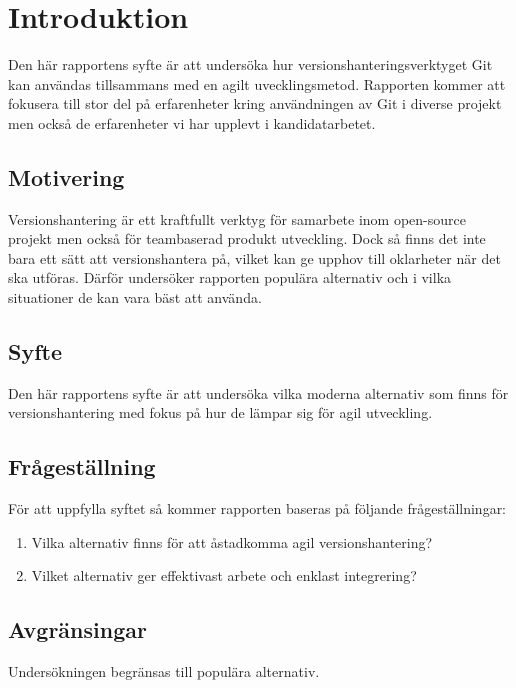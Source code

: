 \section{Introduktion}
\label{sec:bjorn-introduction}

Den här rapportens syfte är att undersöka hur versionshanteringsverktyget Git kan användas tillsammans med en agilt uvecklingsmetod. Rapporten kommer att fokusera till stor del på erfarenheter kring användningen av Git i diverse projekt men också de erfarenheter vi har upplevt i kandidatarbetet.

\subsection{Motivering}
\label{subsec:motivation}

Versionshantering är ett kraftfullt verktyg för samarbete inom open-source projekt men också för teambaserad produkt utveckling. Dock så finns det inte bara ett sätt att versionshantera på, vilket kan ge upphov till oklarheter när det ska utföras. Därför undersöker rapporten populära alternativ och i vilka situationer de kan vara bäst att använda.

\subsection{Syfte}
\label{subsec:reason}
Den här rapportens syfte är att undersöka vilka moderna alternativ som finns för versionshantering med fokus på hur de lämpar sig för agil utveckling.

\subsection{Frågeställning}
\label{subsec:research-questions}

För att uppfylla syftet så kommer rapporten baseras på följande frågeställningar:

\begin{enumerate}
\item Vilka alternativ finns för att åstadkomma agil versionshantering?

\item Vilket alternativ ger effektivast arbete och enklast integrering?
\end{enumerate}

\subsection{Avgränsingar}
\label{subsec:delimitations}

Undersökningen begränsas till populära alternativ.